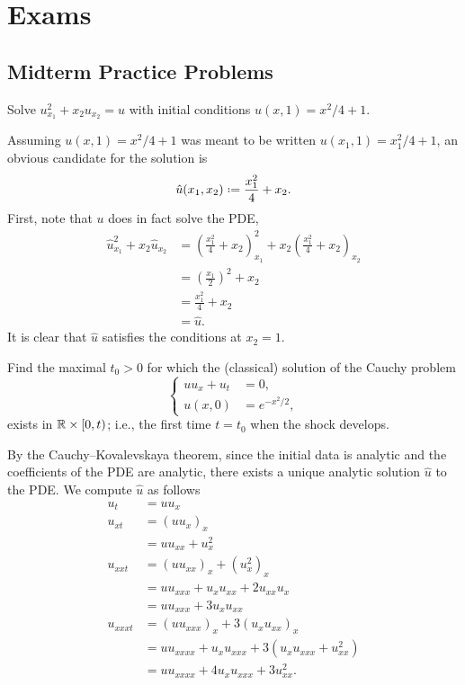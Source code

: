 \section{Exams}
\subsection{Midterm Practice Problems}
\begin{problem}
  Solve \(u_{x_1}^2+x_2u_{x_2}=u\) with initial conditions
  \(u(x,1)=x^2/4+1\).
\end{problem}
\begin{solution*}
  Assuming \(u(x,1)=x^2/4+1\) was meant to be written
  \(u(x_1,1)=x_1^2/4+1\), an obvious candidate for the solution is
  \[
    \hat u(x_1,x_2)\defeq\frac{x_1^2}{4}+x_2.
  \]
  First, note that \(u\) does in fact solve the PDE,
  \begin{align*}
    \hat u_{x_1}^2+x_2\hat u_{x_2}
    &=\left(\frac{x_1^2}{4}+x_2\right)_{x_1}^2
    +x_2\left(\frac{x_1^2}{4}+x_2\right)_{x_2}\\
    &=\left(\frac{x_1}{2}\right)^2+x_2\\
    &=\frac{x_1^2}{4}+x_2\\
    &=\hat u.
  \end{align*}
  It is clear that \(\hat u\) satisfies the conditions at \(x_2=1\).
\end{solution*}

\begin{problem}
  Find the maximal \(t_0>0\) for which the (classical) solution of the
  Cauchy problem
  \[
    \left\{
      \begin{aligned}
        uu_x+u_t&=0,\\
        u(x,0)&=e^{-x^2/2},
      \end{aligned}
    \right.
  \]
  exists in \(\mathbb{R}\times[0,t)\); i.e., the first time \(t=t_0\) when the
  shock develops.
\end{problem}
\begin{solution*}
  By the Cauchy--Kovalevskaya theorem, since the initial data is analytic
  and the coefficients of the PDE are analytic, there exists a unique
  analytic solution \(\hat u\) to the PDE. We compute \(\hat u\) as follows
  \begin{align*}
    u_t&=uu_x\\
    u_{xt}
       &=(uu_x)_{x}\\
       &=uu_{xx}+u_x^2\\
    u_{xxt}
       &=(uu_{xx})_x+(u_x^2)_x\\
       &=uu_{xxx}+u_xu_{xx}+2u_{xx}u_x\\
       &=uu_{xxx}+3u_xu_{xx}\\
    u_{xxxt}
       &=(uu_{xxx})_x+3(u_xu_{xx})_x\\
       &=uu_{xxxx}+u_xu_{xxx}+3(u_xu_{xxx}+u_{xx}^2)\\
       &=uu_{xxxx}+4u_{x}u_{xxx}+3u_{xx}^2.
  \end{align*}
\end{solution*}


